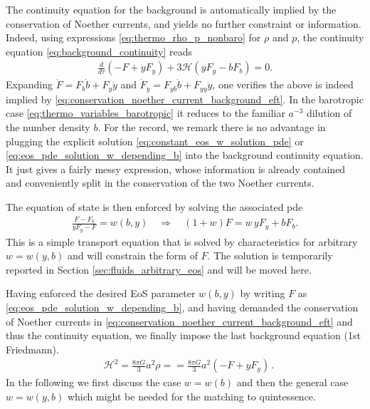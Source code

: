 The continuity equation for the background is automatically implied by the conservation of Noether currents, and yields no further constraint or information.
Indeed, using expressions \eqref{eq:thermo_rho_p_nonbaro} for $\rho$ and $p$, the continuity equation \eqref{eq:background_continuity} reads
\begin{align}\label{eq:backgroud_continuity_eft}
    \frac{d}{d\tau}(-F+yF_y)+3\mathcal{H}(yF_y-bF_b)=0.
\end{align}
Expanding $\dot{F}=F_b\dot{b}+F_y\dot{y}$ and $\dot{F}_y=F_{yb}\dot{b}+F_{yy}\dot{y}$, one verifies the above is indeed implied by \eqref{eq:conservation_noether_current_background_eft}.
In the barotropic case \eqref{eq:thermo_variables_barotropic} it reduces to the familiar $a^{-3}$ dilution of the number density $b$.
For the record, we remark there is no advantage in plugging the explicit solution \eqref{eq:constant_eos_w_solution_pde} or \eqref{eq:eos_pde_solution_w_depending_b} into the background continuity equation.
It just gives a fairly messy expression, whose information is already contained and conveniently split in the conservation of the two Noether currents.

The equation of state is then enforced by solving the associated pde
\begin{align}\label{eq:equation_of_state_eos_pde}
    \frac{F-F_b}{yF_y-F}=w(b,y)\quad\Rightarrow\quad (1+w)F=w\, yF_y+bF_b.
\end{align}
This is a simple transport equation that is solved by characteristics for arbitrary $w=w(y,b)$ and will constrain the form of $F$.
The solution is temporarily reported in Section \ref{sec:fluids_arbitrary_eos} and will be moved here.

Having enforced the desired EoS parameter $w(b,y)$ by writing $F$ as \eqref{eq:eos_pde_solution_w_depending_b}, and having demanded the conservation of Noether currents in \eqref{eq:conservation_noether_current_background_eft} and thus the continuity equation, we finally impose the last background equation (1st Friedmann).
\begin{align}
    &\mathcal{H}^2 = \frac{8\pi G}{3} a^2 \rho = =\frac{8\pi G}{3} a^2 (-F+yF_y)\,.
\end{align}
In the following we first discuss the case $w=w(b)$ and then the general case $w=w(y,b)$ which might be needed for the matching to quintessence.


